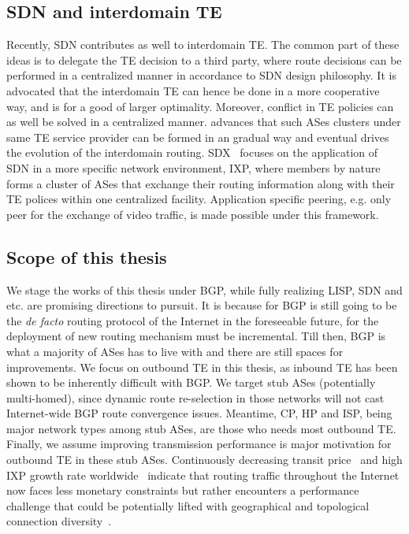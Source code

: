 \subsection{\ac{SDN} and interdomain TE}
Recently, \acf{SDN} contributes as well to interdomain TE. The common part of these ideas is to delegate the TE decision to a third party, where route decisions can be performed in a centralized manner in accordance to \ac{SDN} design philosophy. It is advocated that the interdomain TE can hence be done in a more cooperative way, and is for a good of larger optimality. Moreover, conflict in TE policies can as well be solved in a centralized manner.
\cite{Kotronis2012} advances that such ASes clusters under same TE service provider can be formed in an gradual way and eventual drives the evolution of the interdomain routing.
SDX~\cite{Gupta2014} focuses on the application of \ac{SDN} in a more specific network environment, \ac{IXP}, where members by nature forms a cluster of ASes that exchange their routing information along with their TE polices within one centralized facility. Application specific peering, e.g. only peer for the exchange of video traffic, is made possible under this framework.

\subsection{Scope of this thesis}
We stage the works of this thesis under BGP, while fully realizing \ac{LISP}, \ac{SDN} and etc. are promising directions to pursuit.
It is because for BGP is still going to be the \textit{de facto} routing protocol of the Internet in the foreseeable future, for the deployment of new routing mechanism must be incremental.
Till then,  BGP is what a majority of ASes has to live with and there are still spaces for improvements.
We focus on outbound TE in this thesis, as inbound TE has been shown to be inherently difficult with BGP.
We target stub ASes (potentially multi-homed), since dynamic route re-selection in those networks will not cast Internet-wide BGP route convergence issues.
Meantime, \acf{CP}, \acf{HP} and \acf{ISP}, being major network types among stub ASes, are those who needs most outbound TE.
Finally, we assume improving transmission performance is major motivation for outbound TE in these stub ASes.
Continuously decreasing transit price~\cite{transitprice, drpeering} and high \ac{IXP} growth rate worldwide~\cite{pchixp} indicate that routing traffic throughout the Internet now faces less monetary constraints but rather encounters a performance challenge that could be potentially lifted with geographical and topological connection diversity~\cite{Chiu2015}.

